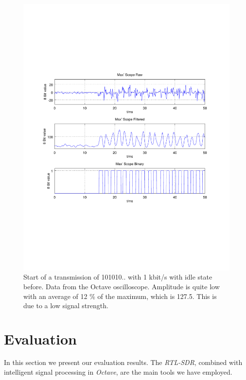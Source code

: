 \documentclass[conference]{IEEEtran}
\begin{document}
\begin{figure}[h]
\centering
\includegraphics[width=\columnwidth]{./fig/transmission}
\caption{Start of a transmission of 101010.. with 1 kbit/s with idle state before. Data from the Octave oscilloscope. Amplitude is quite low with an average of 12 \% of the maximum, which is 127.5. This is due to a low signal strength.}
\label{fig:frame}
\end{figure}

\section{Evaluation}
In this section we present our evaluation results. The \textit{RTL-SDR}, combined with intelligent signal processing in \textit{Octave}, are the main tools we have employed. 
\end{document}
